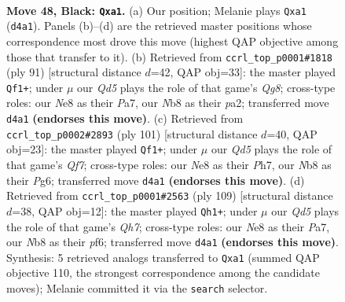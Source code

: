 \documentclass[11pt]{article}
\begin{document}
\clearpage

\begin{figure}[p]\centering
\begin{subfigure}{0.46\textwidth}\centering
\resizebox{\linewidth}{!}{%
\newchessgame
\chessboard[
  setfen={1n2nk2/7Q/7p/p4p2/P2q4/7K/3N4/R7 b - - 4 48},
  showmover=false,
  pgfstyle=straightmove, color=movearrow, markmove={d4-a1}
]}
\caption{}
\end{subfigure}\hfill
\begin{subfigure}{0.46\textwidth}\centering
\resizebox{\linewidth}{!}{%
\newchessgame
\chessboard[
  setfen={5k2/ppQ2p2/8/8/8/5K2/PP4PP/6q1 b - - 30 46},
  showmover=false,
  pgfstyle=straightmove, color=movearrow, markmove={g1-f1}
]}
\caption{}
\end{subfigure}
\\[4pt]
\begin{subfigure}{0.46\textwidth}\centering
\resizebox{\linewidth}{!}{%
\newchessgame
\chessboard[
  setfen={6k1/1Q5p/2p3p1/2P5/1P6/6PP/5q2/7K b - - 6 51},
  showmover=false,
  pgfstyle=straightmove, color=movearrow, markmove={f2-f1}
]}
\caption{}
\end{subfigure}\hfill
\begin{subfigure}{0.46\textwidth}\centering
\resizebox{\linewidth}{!}{%
\newchessgame
\chessboard[
  setfen={5k2/p7/1p2QP2/3p4/8/5K2/PP5q/8 b - - 4 55},
  showmover=false,
  pgfstyle=straightmove, color=movearrow, markmove={h2-h1}
]}
\caption{}
\end{subfigure}
\caption{\textbf{Move 48, Black: \texttt{Qxa1}.} (a) Our position; Melanie plays \texttt{Qxa1} (\texttt{d4a1}). Panels (b)--(d) are the retrieved master positions whose correspondence most drove this move (highest QAP objective among those that transfer to it). (b) Retrieved from \texttt{ccrl\_top\_p0001\#1818} (ply 91) [structural distance $d$=42, QAP obj=33]: the master played \texttt{Qf1+}; under $\mu$ our \emph{Qd5} plays the role of that game's \emph{Qg8}; cross-type roles: our \emph{N}e8 as their \emph{P}a7, our \emph{N}b8 as their \emph{p}a2; transferred move \texttt{d4a1} \textbf{(endorses this move)}. (c) Retrieved from \texttt{ccrl\_top\_p0002\#2893} (ply 101) [structural distance $d$=40, QAP obj=23]: the master played \texttt{Qf1+}; under $\mu$ our \emph{Qd5} plays the role of that game's \emph{Qf7}; cross-type roles: our \emph{N}e8 as their \emph{P}h7, our \emph{N}b8 as their \emph{P}g6; transferred move \texttt{d4a1} \textbf{(endorses this move)}. (d) Retrieved from \texttt{ccrl\_top\_p0001\#2563} (ply 109) [structural distance $d$=38, QAP obj=12]: the master played \texttt{Qh1+}; under $\mu$ our \emph{Qd5} plays the role of that game's \emph{Qh7}; cross-type roles: our \emph{N}e8 as their \emph{P}a7, our \emph{N}b8 as their \emph{p}f6; transferred move \texttt{d4a1} \textbf{(endorses this move)}. Synthesis: 5 retrieved analogs transferred to \texttt{Qxa1} (summed QAP objective 110, the strongest correspondence among the candidate moves); Melanie committed it via the \texttt{search} selector.}
\label{fig:thought-m95}
\end{figure}
\end{document}
